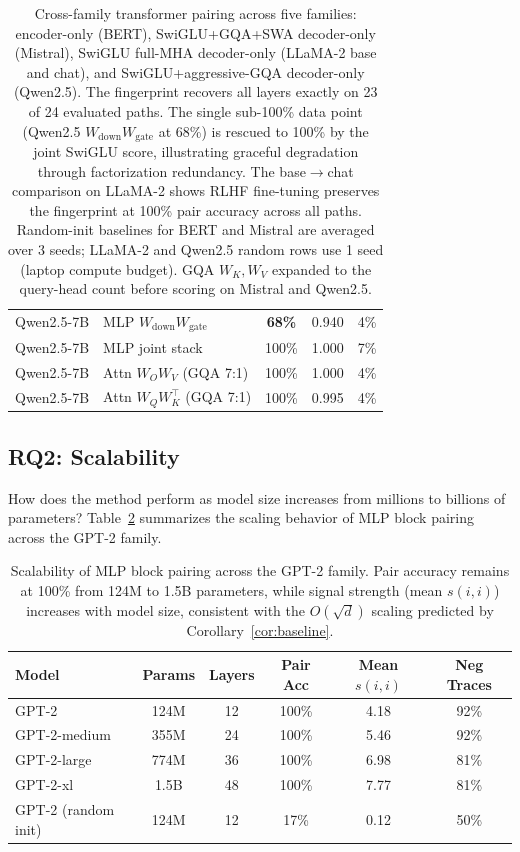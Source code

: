 \documentclass[wcp]{jmlr}
\begin{document}
\begin{table}[h]
\begin{tabular}{llccc}
Qwen2.5-7B      & MLP $W_{\text{down}} W_{\text{gate}}$  & \textbf{68\%}  & 0.940 & 4\% \\
Qwen2.5-7B      & MLP joint stack                        & 100\% & 1.000 & 7\% \\
Qwen2.5-7B      & Attn $W_O W_V$ (GQA 7:1)               & 100\% & 1.000 & 4\% \\
Qwen2.5-7B      & Attn $W_Q W_K^\top$ (GQA 7:1)          & 100\% & 0.995 & 4\% \\
\bottomrule
\end{tabular}
\caption{Cross-family transformer pairing across five families: encoder-only (BERT), SwiGLU+GQA+SWA decoder-only (Mistral), SwiGLU full-MHA decoder-only (LLaMA-2 base and chat), and SwiGLU+aggressive-GQA decoder-only (Qwen2.5). The fingerprint recovers all layers exactly on 23 of 24 evaluated paths. The single sub-100\% data point (Qwen2.5 $W_{\text{down}}W_{\text{gate}}$ at 68\%) is rescued to 100\% by the joint SwiGLU score, illustrating graceful degradation through factorization redundancy. The base$\to$chat comparison on LLaMA-2 shows RLHF fine-tuning preserves the fingerprint at 100\% pair accuracy across all paths. Random-init baselines for BERT and Mistral are averaged over 3 seeds; LLaMA-2 and Qwen2.5 random rows use 1 seed (laptop compute budget). GQA $W_K,W_V$ expanded to the query-head count before scoring on Mistral and Qwen2.5.}
\label{tab:transformer_family}
\end{table}

\subsection{RQ2: Scalability}

How does the method perform as model size increases from millions to billions of parameters? Table~\ref{tab:gpt2_scaling} summarizes the scaling behavior of MLP block pairing across the GPT-2 family.

\begin{table}[t]
\centering
\small
\renewcommand{\arraystretch}{1.1}
\begin{tabular}{lccccc}
\toprule
Model & Params & Layers & Pair Acc & Mean $s(i,i)$ & Neg Traces \\
\midrule
GPT-2        & 124M  & 12 & 100\% & 4.18 & 92\% \\
GPT-2-medium & 355M  & 24 & 100\% & 5.46 & 92\% \\
GPT-2-large  & 774M  & 36 & 100\% & 6.98 & 81\% \\
GPT-2-xl     & 1.5B  & 48 & 100\% & 7.77 & 81\% \\
\midrule
GPT-2 (random init) & 124M & 12 & 17\% & 0.12 & 50\% \\
\bottomrule
\end{tabular}
\caption{Scalability of MLP block pairing across the GPT-2 family. Pair accuracy remains at 100\% from 124M to 1.5B parameters, while signal strength (mean $s(i,i)$) increases with model size, consistent with the $O(\sqrt{d})$ scaling predicted by Corollary~\ref{cor:baseline}.}
\label{tab:gpt2_scaling}
\end{table}
\end{document}
